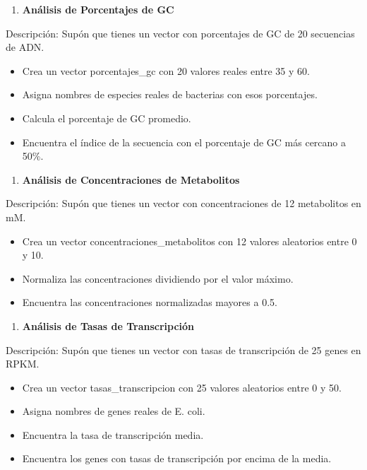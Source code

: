 \documentclass[
]{book}
\providecommand{\tightlist}{%
  \setlength{\itemsep}{0pt}\setlength{\parskip}{0pt}}
\begin{document}
\begin{enumerate}
\def\labelenumi{\arabic{enumi}.}
\setcounter{enumi}{6}
\tightlist
\item
  \textbf{Análisis de Porcentajes de GC}
\end{enumerate}

Descripción: Supón que tienes un vector con porcentajes de GC de 20 secuencias de ADN.

\begin{itemize}
\tightlist
\item
  Crea un vector porcentajes\_gc con 20 valores reales entre 35 y 60.
\item
  Asigna nombres de especies reales de bacterias con esos porcentajes.
\item
  Calcula el porcentaje de GC promedio.
\item
  Encuentra el índice de la secuencia con el porcentaje de GC más cercano a 50\%.
\end{itemize}

\begin{enumerate}
\def\labelenumi{\arabic{enumi}.}
\setcounter{enumi}{7}
\tightlist
\item
  \textbf{Análisis de Concentraciones de Metabolitos}
\end{enumerate}

Descripción: Supón que tienes un vector con concentraciones de 12 metabolitos en mM.

\begin{itemize}
\tightlist
\item
  Crea un vector concentraciones\_metabolitos con 12 valores aleatorios entre 0 y 10.
\item
  Normaliza las concentraciones dividiendo por el valor máximo.
\item
  Encuentra las concentraciones normalizadas mayores a 0.5.
\end{itemize}

\begin{enumerate}
\def\labelenumi{\arabic{enumi}.}
\setcounter{enumi}{8}
\tightlist
\item
  \textbf{Análisis de Tasas de Transcripción}
\end{enumerate}

Descripción: Supón que tienes un vector con tasas de transcripción de 25 genes en RPKM.

\begin{itemize}
\tightlist
\item
  Crea un vector tasas\_transcripcion con 25 valores aleatorios entre 0 y 50.
\item
  Asigna nombres de genes reales de E. coli.
\item
  Encuentra la tasa de transcripción media.
\item
  Encuentra los genes con tasas de transcripción por encima de la media.
\end{itemize}
\end{document}
